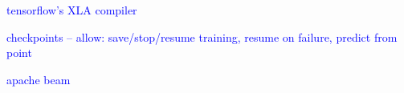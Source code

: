 

\textcolor{blue}{tensorflow's XLA compiler}

\textcolor{blue}{checkpoints -- allow: save/stop/resume training, resume on failure, predict from point}

\textcolor{blue}{apache beam}


